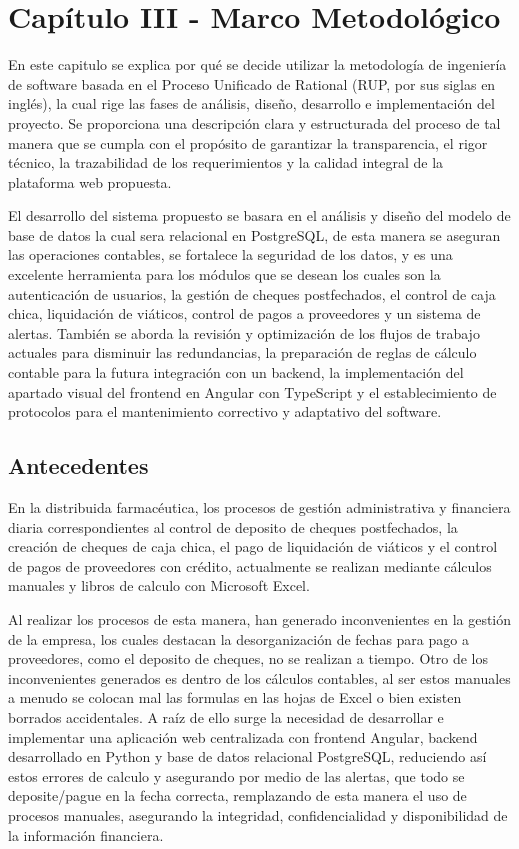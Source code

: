 \setcounter{section}{2} %

\section{Capítulo III - Marco Metodológico}

En este capitulo se explica por qué se decide utilizar la metodología de ingeniería de software basada en el Proceso Unificado de Rational (RUP, por sus siglas en inglés), la cual rige las fases de análisis, diseño, desarrollo e implementación del proyecto. Se proporciona una descripción clara y estructurada del proceso de tal manera que se cumpla con el propósito de garantizar la transparencia, el rigor técnico, la trazabilidad de los requerimientos y la calidad integral de la plataforma web propuesta.

El desarrollo del sistema propuesto se basara en el análisis y diseño del modelo de  base  de datos la cual sera relacional en PostgreSQL, de esta manera se aseguran las operaciones contables, se fortalece la seguridad de los datos, y es una excelente herramienta para los módulos que se desean los cuales son la autenticación de usuarios, la gestión de cheques postfechados, el control de caja chica, liquidación de viáticos, control de pagos a proveedores y un sistema de alertas. También se aborda la revisión y optimización de los flujos de trabajo actuales para disminuir las redundancias, la preparación de reglas de cálculo contable para la futura integración con un backend, la implementación del apartado visual del frontend en Angular con TypeScript y el establecimiento de protocolos para el mantenimiento correctivo y adaptativo del software.

\subsection{Antecedentes} 

En la distribuida farmacéutica, los procesos de gestión administrativa y financiera diaria correspondientes al control de deposito de cheques postfechados, la creación de cheques de caja chica, el pago de liquidación de viáticos y el control de pagos de proveedores con crédito, actualmente se realizan mediante cálculos manuales y libros de calculo con Microsoft Excel.

Al realizar los procesos de esta manera, han generado inconvenientes en la gestión de la empresa, los cuales destacan la desorganización de fechas para pago a proveedores, como el deposito de cheques, no se realizan a tiempo. Otro de los inconvenientes generados es dentro de los cálculos contables, al ser estos manuales a menudo se colocan mal las formulas en las hojas de Excel o bien existen borrados accidentales. A raíz de ello surge la necesidad de desarrollar e implementar una aplicación web centralizada con frontend Angular, backend desarrollado en Python y base de datos relacional PostgreSQL, reduciendo así estos errores de calculo y asegurando por medio de las alertas, que todo se deposite/pague en la fecha correcta, remplazando de esta manera el uso de procesos manuales, asegurando la integridad, confidencialidad y disponibilidad de la información financiera.

